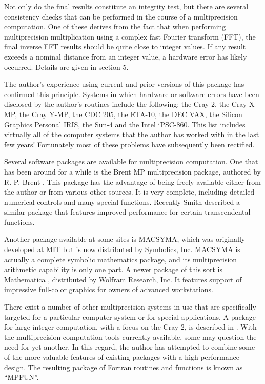 Not only do the final results constitute an integrity test, but there
are several consistency checks that can be performed in the course of
a multiprecision computation.  One of these derives from the fact that
when performing multiprecision multiplication using a complex fast
Fourier transform (FFT), the final inverse FFT results should be quite
close to integer values.  If any result exceeds a nominal distance
from an integer value, a hardware error has likely occurred.  Details
are given in section 5.

The author's experience using current and prior versions of this
package has confirmed this principle.  Systems in which hardware or
software errors have been disclosed by the author's routines include
the following: the Cray-2, the Cray X-MP, the Cray Y-MP, the CDC 205,
the ETA-10, the DEC VAX, the Silicon Graphics Personal IRIS, the Sun-4
and the Intel iPSC-860.  This list includes virtually all of the
computer systems that the author has worked with in the last few
years!  Fortunately most of these problems have subsequently been
rectified.

\vspace{2ex}

Several software packages are available for multiprecision
computation.  One that has been around for a while is the Brent MP
multiprecision package, authored by R. P. Brent \cite{brent2}.  This
package has the advantage of being freely available either from the
author or from various other sources.  It is very complete, including
detailed numerical controls and many special functions.  Recently
Smith \cite{smith} described a similar package that features improved
performance for certain transcendental functions.

Another package available at some sites is MACSYMA, which was
originally developed at MIT but is now distributed by Symbolics, Inc.
MACSYMA is actually a complete symbolic mathematics package, and its
multiprecision arithmetic capability is only one part.  A newer
package of this sort is Mathematica \cite{mathem}, distributed by
Wolfram Research, Inc.  It features support of impressive full-color
graphics for owners of advanced workstations.

There exist a number of other multiprecision systems in use that are
specifically targeted for a particular computer system or for special
applications.  A package for large integer computation, with a focus
on the Cray-2, is described in \cite{buell}.  With the multiprecision
computation tools currently available, some may question the need for
yet another.  In this regard, the author has attempted to combine some
of the more valuable features of existing packages with a high
performance design.  The resulting package of Fortran routines and
functions is known as ``MPFUN''.

